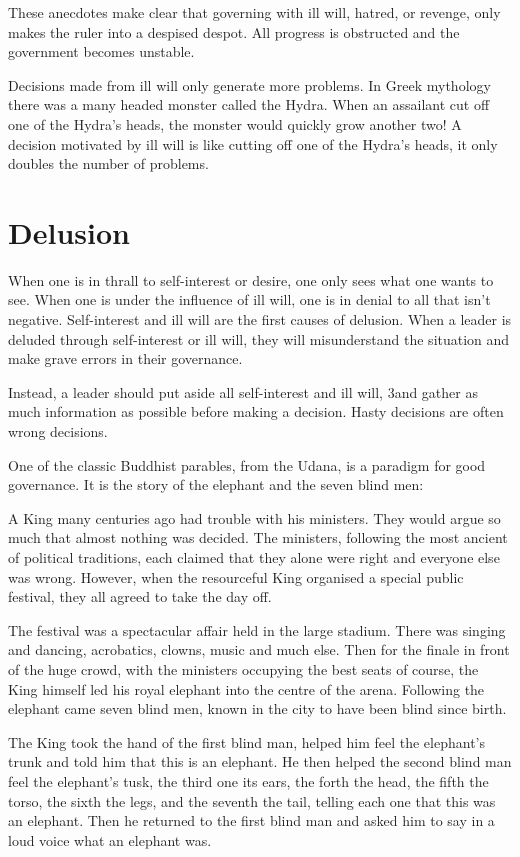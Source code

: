 \documentclass[11pt, openany]{book}
\begin{document}
These anecdotes make clear that governing with ill will, hatred, or revenge, only makes the ruler into a despised despot. All progress is obstructed and the government becomes unstable.

Decisions made from ill will only generate more problems. In Greek mythology there was a many headed monster called the Hydra. When an assailant cut off one of the Hydra’s heads, the monster would quickly grow another two! A decision motivated by ill will is like cutting off one of the Hydra’s heads, it only doubles the number of problems.

\section{Delusion}

When one is in thrall to self-interest or desire, one only sees what one wants to see. When one is under the influence of ill will, one is in denial to all that isn’t negative. Self-interest and ill will are the first causes of delusion. When a leader is deluded through self-interest or ill will, they will misunderstand the situation and make grave errors in their governance.

Instead, a leader should put aside all self-interest and ill will, 3and gather as much information as possible before making a decision. Hasty decisions are often wrong decisions.

One of the classic Buddhist parables, from the Udana, is a paradigm for good governance. It is the story of the elephant and the seven blind men:

A King many centuries ago had trouble with his ministers. They would argue so much that almost nothing was decided. The ministers, following the most ancient of political traditions, each claimed that they alone were right and everyone else was wrong. However, when the resourceful King organised a special public festival, they all agreed to take the day off.

The festival was a spectacular affair held in the large stadium. There was singing and dancing, acrobatics, clowns, music and much else. Then for the finale in front of the huge crowd, with the ministers occupying the best seats of course, the King himself led his royal elephant into the centre of the arena. Following the elephant came seven blind men, known in the city to have been blind since birth.

The King took the hand of the first blind man, helped him feel the elephant’s trunk and told him that this is an elephant. He then helped the second blind man feel the elephant’s tusk, the third one its ears, the forth the head, the fifth the torso, the sixth the legs, and the seventh the tail, telling each one that this was an elephant. Then he returned to the first blind man and asked him to say in a loud voice what an elephant was.
\end{document}
